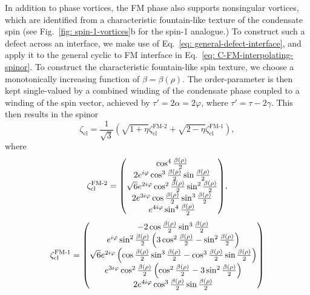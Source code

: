 In addition to phase vortices, the FM phase also supports nonsingular vortices,
which are identified from a characteristic fountain-like texture of
the condensate spin (see Fig.~\ref{fig: spin-1-vortices}b for the spin-1
analogue.)
To construct such a defect across an interface, we make use of
Eq.~\eqref{eq: general-defect-interface}, and apply it to the general cyclic to
FM interface in Eq.~\eqref{eq: C-FM-interpolating-spinor}.
To construct the characteristic fountain-like spin texture, we choose a
monotonically increasing function of \(\beta=\beta(\rho)\).
The order-parameter is then kept single-valued by a combined winding of the
condensate phase coupled to a winding of the spin vector, achieved by
\(\tau'=2\alpha=2\varphi \), where \(\tau'=\tau-2\gamma \).
This then results in the spinor
\begin{equation}\label{eq: C-FM-coreless-general}
    \zeta_\text{cl} = \frac{1}{\sqrt{3}}\left(
        \sqrt{1 + \eta}\zeta^\text{FM-2}_\text{cl}
        + \sqrt{2 - \eta}\zeta^\text{FM-1}_\text{cl}\right),
\end{equation}
where
\begin{align}\label{eq: C-FM-coreless-FM-limits}
    \zeta^\text{FM-2}_\text{cl} =
    \mqty(
    \cos^4\frac{\beta(\rho)}{2}                                        \\
    2e^{i\varphi}\cos^3\frac{\beta(\rho)}{2}\sin\frac{\beta(\rho)}{2}  \\
    \sqrt{6}e^{2i\varphi}\cos^2\frac{\beta(\rho)}{2}\sin^2
    \frac{\beta(\rho)}{2}                                              \\
    2e^{3i\varphi}\cos\frac{\beta(\rho)}{2}\sin^3\frac{\beta(\rho)}{2} \\
    e^{4i\varphi}\sin^4\frac{\beta(\rho)}{2}
    ),
\end{align}
\begin{align}
    \zeta^\text{FM-1}_\text{cl} =
    \mqty(
    -2\cos\frac{\beta(\rho)}{2}\sin^3\frac{\beta(\rho)}{2}         \\
    e^{i\varphi}\sin^2\frac{\beta(\rho)}{2}\left(3\cos^2
    \frac{\beta(\rho)}{2}-\sin^2\frac{\beta(\rho)}{2}\right)       \\
    \sqrt{6}e^{2i\varphi}\left(\cos\frac{\beta(\rho)}{2}\sin^3
    \frac{\beta(\rho)}{2}
    - \cos^3\frac{\beta(\rho)}{2}\sin\frac{\beta(\rho)}{2} \right) \\
    e^{3i\varphi}\cos^2\frac{\beta(\rho)}{2}\left(\cos^2
    \frac{\beta(\rho)}{2}-3\sin^2\frac{\beta(\rho)}{2}\right)      \\
    2e^{4i\varphi}\cos^3\frac{\beta(\rho)}{2}\sin\frac{\beta(\rho)}{2}
    )
\end{align}
